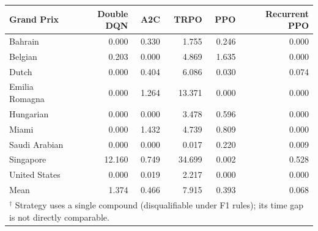 \begin{tabular}{lrrrrr}
\toprule
Grand Prix & Double DQN & A2C & TRPO & PPO & Recurrent PPO \\
\midrule
Bahrain & 0.000 & 0.330 & 1.755 & 0.246 & 0.000 \\
Belgian & 0.203 & 0.000 & 4.869 & 1.635 & 0.000 \\
Dutch & 0.000 & 0.404 & 6.086 & 0.030 & 0.074 \\
Emilia Romagna & 0.000 & 1.264 & 13.371 & 0.000 & 0.000 \\
Hungarian & 0.000 & 0.000 & 3.478 & 0.596 & 0.000 \\
Miami & 0.000 & 1.432 & 4.739 & 0.809 & 0.000 \\
Saudi Arabian & 0.000 & 0.000 & 0.017 & 0.220 & 0.009 \\
Singapore & 12.160 & 0.749 & 34.699 & 0.002 & 0.528 \\
United States & 0.000 & 0.019 & 2.217 & 0.000 & 0.000 \\
\midrule
Mean & 1.374 & 0.466 & 7.915 & 0.393 & 0.068 \\
\bottomrule
\multicolumn{6}{l}{\footnotesize $^\dagger$ Strategy uses a single compound (disqualifiable under F1 rules); its time gap is not directly comparable.} \\
\end{tabular}